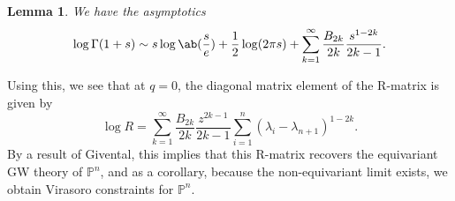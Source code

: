 \documentclass{amsart}
\newtheorem{lem}[thm]{Lemma}
\theoremstyle{definition}
\theoremstyle{remark}
\theoremstyle{plain}
\theoremstyle{definition}
\theoremstyle{remark}
\renewcommand{\P}{\mathbb{P}}
\newcommand{\1}{\mathbf{1}}
\newcommand{\2}{\mathbf{2}}
\newcommand{\3}{\mathbf{3}}
\begin{document}
\begin{lem}
    We have the asymptotics
    \[ \log \Gamma(1+s) \sim s \log \ab(\frac{s}{e}) + \frac{1}{2} \log(2\pi s) + \sum_{k=1}^{\infty} \frac{B_{2k}}{2k} \frac{s^{1-2k}}{2k-1}. \]
\end{lem}
Using this, we see that at \(q = 0\), the diagonal matrix element of the R-matrix is given by
\[ \log R = \sum_{k=1}^{\infty} \frac{B_{2k}}{2k} \frac{z^{2k-1}}{2k-1} \sum_{i =1}^n (\lambda_i - \lambda_{n+1})^{1-2k}. \]
By a result of Givental, this implies that this R-matrix recovers the equivariant GW theory of \(\P^n\), and as a corollary, because the non-equivariant limit exists, we obtain Virasoro constraints for \(\P^n\). 
\end{document}
